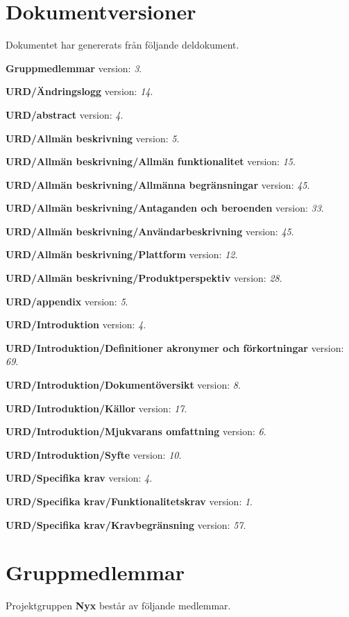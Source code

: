 \documentclass[a4paper, twoside, 11pt, titlepage]{article}
\begin{document}
\clearpage
\section*{Dokumentversioner}


Dokumentet har genererats från följande deldokument.

\textbf{Gruppmedlemmar} version: \emph{3}.

\textbf{URD/Ändringslogg} version: \emph{14}.

\textbf{URD/abstract} version: \emph{4}.

\textbf{URD/Allmän beskrivning} version: \emph{5}.

\textbf{URD/Allmän beskrivning/Allmän funktionalitet} version: \emph{15}.

\textbf{URD/Allmän beskrivning/Allmänna begränsningar} version: \emph{45}.

\textbf{URD/Allmän beskrivning/Antaganden och beroenden} version: \emph{33}.

\textbf{URD/Allmän beskrivning/Användarbeskrivning} version: \emph{45}.

\textbf{URD/Allmän beskrivning/Plattform} version: \emph{12}.

\textbf{URD/Allmän beskrivning/Produktperspektiv} version: \emph{28}.

\textbf{URD/appendix} version: \emph{5}.

\textbf{URD/Introduktion} version: \emph{4}.

\textbf{URD/Introduktion/Definitioner akronymer och förkortningar} version: \emph{69}.

\textbf{URD/Introduktion/Dokumentöversikt} version: \emph{8}.

\textbf{URD/Introduktion/Källor} version: \emph{17}.

\textbf{URD/Introduktion/Mjukvarans omfattning} version: \emph{6}.

\textbf{URD/Introduktion/Syfte} version: \emph{10}.

\textbf{URD/Specifika krav} version: \emph{4}.

\textbf{URD/Specifika krav/Funktionalitetskrav} version: \emph{1}.

\textbf{URD/Specifika krav/Kravbegränsning} version: \emph{57}.

\clearpage
\section*{Gruppmedlemmar}


Projektgruppen \textbf{Nyx} består av följande medlemmar.
\end{document}

